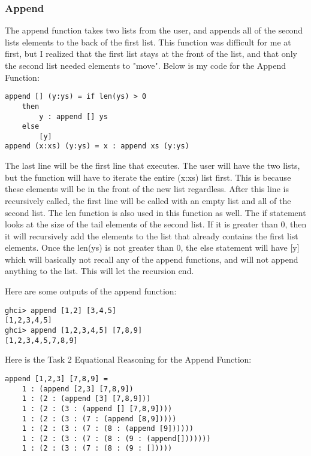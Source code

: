 \documentclass{article}
\theoremstyle{theorem}
\theoremstyle{definition}
\theoremstyle{remark}
\begin{document}
\subsubsection{Append}
The append function takes two lists from the user, and appends all of the second lists elements to the back of the first list. This function was difficult for me at first, but I realized that the first list stays at the front of the list, and that only the second list needed elements to "move". \newline
\newline Below is my code for the Append Function:
\begin{verbatim}
append [] (y:ys) = if len(ys) > 0
    then 
        y : append [] ys
    else
        [y] 
append (x:xs) (y:ys) = x : append xs (y:ys)
\end{verbatim}
The last line will be the first line that executes. The user will have the two lists, but the function will have to iterate the entire (x:xs) list first. This is because these elements will be in the front of the new list regardless. After this line is recursively called, the first line will be called with an empty list and all of the second list. The len function is also used in this function as well. The if statement looks at the size of the tail elements of the second list. If it is greater than 0, then it will recursively add the elements to the list that already contains the first list elements. Once the len(ys) is not greater than 0, the else statement will have [y] which will basically not recall any of the append functions, and will not append anything to the list. This will let the recursion end. \newline\newline

 \noindent Here are some outputs of the append function:\newline
\begin{verbatim}
ghci> append [1,2] [3,4,5]
[1,2,3,4,5]
ghci> append [1,2,3,4,5] [7,8,9]
[1,2,3,4,5,7,8,9]
\end{verbatim}

\noindent\newline\newline Here is the Task 2 Equational Reasoning for the Append Function:
\begin{verbatim}
append [1,2,3] [7,8,9] =
    1 : (append [2,3] [7,8,9])
    1 : (2 : (append [3] [7,8,9]))
    1 : (2 : (3 : (append [] [7,8,9])))
    1 : (2 : (3 : (7 : (append [8,9]))))
    1 : (2 : (3 : (7 : (8 : (append [9])))))
    1 : (2 : (3 : (7 : (8 : (9 : (append[]))))))
    1 : (2 : (3 : (7 : (8 : (9 : []))))
\end{verbatim}
\end{document}
